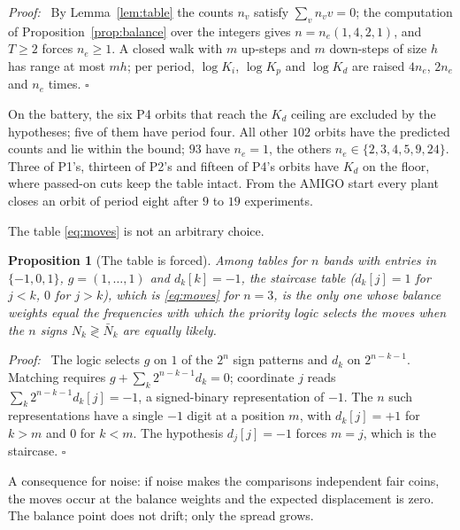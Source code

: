 \documentclass[letterpaper, 10 pt, conference]{ieeeconf}
\newtheorem{proposition}{Proposition}
\renewenvironment{proof}{\noindent\textit{Proof:}\ }{\hfill$\square$\par\smallskip}
\newcommand{\Nbar}{\bar{N}}
\begin{document}
\begin{proof}
By Lemma~\ref{lem:table} the counts $n_v$ satisfy $\sum_v n_v v = 0$; the
computation of Proposition~\ref{prop:balance} over the integers gives
$n = n_e(1,4,2,1)$, and $T \ge 2$ forces $n_e \ge 1$. A closed walk with
$m$ up-steps and $m$ down-steps of size $h$ has range at most $m h$; per
period, $\log K_i$, $\log K_p$ and $\log K_d$ are raised $4n_e$, $2n_e$ and
$n_e$ times.
\end{proof}

On the battery, the six P4 orbits that reach the $K_d$ ceiling are excluded
by the hypotheses; five of them have period four. All other $102$ orbits have
the predicted counts and lie within the bound; $93$ have $n_e = 1$, the others
$n_e \in \{2, 3, 4, 5, 9, 24\}$. Three of P1's, thirteen of P2's and fifteen
of P4's orbits have $K_d$ on the floor, where passed-on cuts keep the table
intact. From the AMIGO start every plant closes an orbit of period eight after
$9$ to $19$ experiments.

The table \eqref{eq:moves} is not an arbitrary choice.

\begin{proposition}[The table is forced]\label{prop:forced}
Among tables for $n$ bands with entries in $\{-1, 0, 1\}$, $g = (1, \dots, 1)$
and $d_k[k] = -1$, the staircase table ($d_k[j] = 1$ for $j < k$, $0$ for
$j > k$), which is \eqref{eq:moves} for $n = 3$, is the only one whose balance
weights equal the frequencies with which the priority logic selects the
moves when the $n$ signs $N_k \gtrless \Nbar_k$ are equally likely.
\end{proposition}

\begin{proof}
The logic selects $g$ on $1$ of the $2^n$ sign patterns and $d_k$ on
$2^{n-k-1}$. Matching requires $g + \sum_k 2^{n-k-1} d_k = 0$; coordinate $j$
reads $\sum_k 2^{n-k-1} d_k[j] = -1$, a signed-binary representation of $-1$.
The $n$ such representations have a single $-1$ digit at a position $m$,
with $d_k[j] = +1$ for $k > m$ and $0$ for $k < m$. The hypothesis
$d_j[j] = -1$ forces $m = j$, which is the staircase.
\end{proof}

A consequence for noise: if noise makes the comparisons independent fair
coins, the moves occur at the balance weights and the expected displacement
is zero. The balance point does not drift; only the spread grows.

\end{document}
